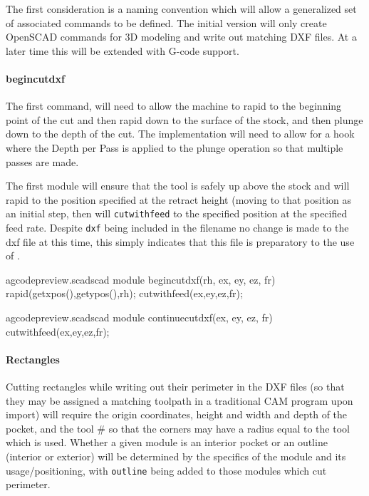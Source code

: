 \documentclass{ltxdoc}
\begin{document}
The first consideration is a naming convention which will allow a generalized set of associated commands to be defined. The initial version will only create OpenSCAD commands for 3D modeling and write out matching DXF files. At a later time this will be extended with G-code support.
 
\paragraph{begincutdxf}
 
The first command,  will need to allow the machine to rapid to the beginning point of the cut and then rapid down to the surface of the stock, and then plunge down to the depth of the cut. The implementation will need to allow for a hook where the Depth per Pass is applied to the plunge operation so that multiple passes are made.

The first module will ensure that the tool is safely up above the stock and will rapid to the position specified at the retract height (moving to that position as an initial step, then will \texttt{cutwithfeed} to the specified position at the specified feed rate. Despite \texttt{dxf} being included in the filename no change is made to the dxf file at this time, this simply indicates that this file is preparatory to the use of .

\lstset{firstnumber=\thegcpscad}
\begin{writecode}{a}{gcodepreview.scad}{scad}
module begincutdxf(rh, ex, ey, ez, fr) {
  rapid(getxpos(),getypos(),rh);
  cutwithfeed(ex,ey,ez,fr);
}

\end{writecode}
\addtocounter{gcpscad}{5}
 
\lstset{firstnumber=\thegcpscad}
\begin{writecode}{a}{gcodepreview.scad}{scad}
module continuecutdxf(ex, ey, ez, fr) {
  cutwithfeed(ex,ey,ez,fr);
}

\end{writecode}
\addtocounter{gcpscad}{4}

\paragraph{Rectangles}

Cutting rectangles while writing out their perimeter in the DXF files (so that they may be assigned a matching toolpath in a traditional CAM program upon import) will require the origin coordinates, height and width and depth of the pocket, and the tool \# so that the corners may have a radius equal to the tool which is used. Whether a given module is an interior pocket or an outline (interior or exterior) will be determined by the specifics of the module and its usage/positioning, with \texttt{outline} being added to those modules which cut perimeter.
\end{document}
